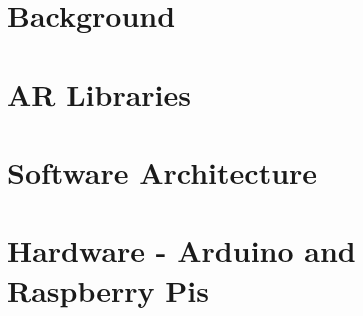 \section{Background}


\section{AR Libraries}


\section{Software Architecture}


\section{Hardware - Arduino and Raspberry Pis}